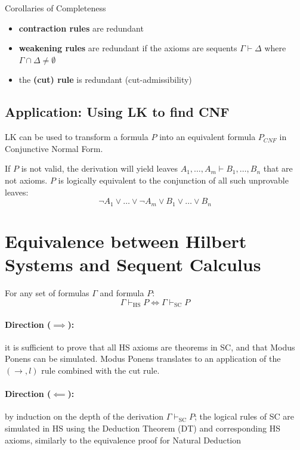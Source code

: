 \documentclass[a4paper, 11pt]{report}
\begin{document}
\begin{gframe}{Corollaries of Completeness}
\begin{itemize}
    \item \textbf{contraction rules} are redundant
    \item \textbf{weakening rules} are redundant if the axioms are sequents $\Gamma \vdash \Delta$ where $\Gamma \cap \Delta \neq \emptyset$
    \item the \textbf{(cut) rule} is redundant (cut-admissibility)
\end{itemize}
\end{gframe}

\subsection{Application: Using LK to find CNF}
LK can be used to transform a formula $P$ into an equivalent formula $P_{CNF}$ in Conjunctive Normal Form.

If $P$ is not valid, the derivation will yield leaves $A_1, \dots, A_m \vdash B_1, \dots, B_n$ that are not axioms. $P$ is logically equivalent to the conjunction of all such unprovable leaves:
$$ \neg A_1 \vee \dots \vee \neg A_m \vee B_1 \vee \dots \vee B_n $$

\section{Equivalence between Hilbert Systems and Sequent Calculus}

\begin{thmframe}{}{}
For any set of formulas $\Gamma$ and formula $P$:
\[
    \Gamma \vdash_{\text{HS}} P \iff \Gamma \vdash_{\text{SC}} P
\]
\end{thmframe}
\begin{proofframe}{}{}
    \vspace{-1em}
\paragraph{Direction ($\implies$):} it is sufficient to prove that all HS axioms are theorems in SC, and that Modus Ponens can be simulated. Modus Ponens translates to an application of the $(\rightarrow, l)$ rule combined with the cut rule.
    \vspace{-1em}
\paragraph{Direction ($\impliedby$):} by induction on the depth of the derivation $\Gamma \vdash_{\text{SC}} P$; the logical rules of SC are simulated in HS using the Deduction Theorem (DT) and corresponding HS axioms, similarly to the equivalence proof for Natural Deduction
\end{proofframe}
\end{document}
